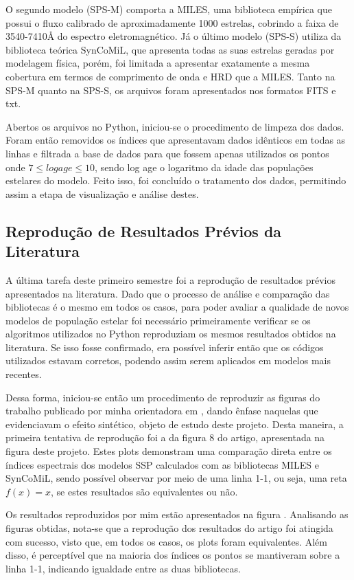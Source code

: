 \documentclass[12pt]{projeto}
\begin{document}
O segundo modelo (SPS-M) comporta a MILES, uma biblioteca empírica que possui o fluxo calibrado de aproximadamente
1000 estrelas, cobrindo a faixa de 3540-7410Å do espectro eletromagnético. Já o último modelo (SPS-S) utiliza da biblioteca teórica SynCoMiL, que apresenta todas as suas estrelas geradas por modelagem física, porém, foi limitada a apresentar exatamente a mesma cobertura em termos de comprimento de onda e HRD que a MILES. Tanto na SPS-M quanto na SPS-S, os arquivos foram apresentados nos formatos FITS e txt.


Abertos os arquivos no Python, iniciou-se o procedimento de limpeza dos dados. Foram então removidos os índices que apresentavam dados idênticos em todas as linhas e filtrada a base de dados para que fossem apenas utilizados os pontos onde \(7 \leq log age \leq 10\), sendo log age o logaritmo da idade das populações estelares do modelo. Feito isso, foi concluído o tratamento dos dados, permitindo assim a etapa de visualização e análise destes. 


\subsection{Reprodução de Resultados Prévios da Literatura}
A última tarefa deste primeiro semestre foi a reprodução de resultados prévios apresentados na literatura. Dado que o processo de análise e comparação das bibliotecas é o mesmo em todos os casos, para poder avaliar a qualidade de novos modelos de população estelar foi necessário primeiramente verificar se os algoritmos utilizados no Python reproduziam os mesmos resultados obtidos na literatura. Se isso fosse confirmado, era possível inferir então que os códigos utilizados estavam corretos, podendo assim serem aplicados em modelos mais recentes.

Dessa forma, iniciou-se então um procedimento de reproduzir as figuras do trabalho publicado por minha orientadora em \cite{Paula2020}, dando ênfase naquelas que evidenciavam o efeito sintético, objeto de estudo deste projeto. Desta maneira, a primeira tentativa de reprodução foi a da figura 8 do artigo, apresentada na figura  deste projeto. Estes plots demonstram uma comparação direta entre os índices espectrais dos modelos SSP calculados com as bibliotecas MILES  e SynCoMiL, sendo possível observar por meio de uma linha 1-1, ou seja, uma reta \(f(x) = x\), se estes resultados são equivalentes ou não.



Os resultados reproduzidos por mim estão apresentados na figura .
Analisando as figuras obtidas, nota-se que a reprodução dos resultados do artigo foi atingida com sucesso, visto que, em todos os casos, os plots foram equivalentes. Além disso, é perceptível que na maioria dos índices os pontos se mantiveram sobre a linha 1-1, indicando igualdade entre as duas bibliotecas. 
\end{document}
